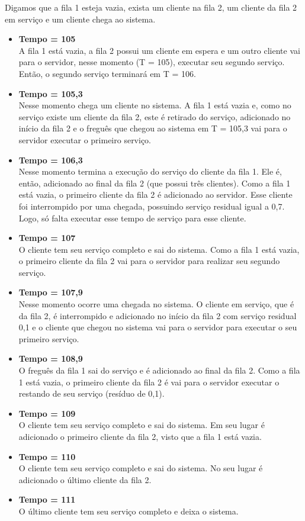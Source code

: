 \documentclass[a4paper,10pt]{article}
\begin{document}
       Digamos que a fila 1 esteja vazia, exista um cliente na fila 2, um cliente da fila 2 em serviço e um cliente chega ao sistema.
      \begin{itemize}
	  \item \textbf{Tempo = 105\\}
	  A fila 1 está vazia, a fila 2 possui um cliente em espera e um outro cliente vai para o servidor, nesse momento (T = 105), executar seu segundo serviço. Então, o segundo serviço terminará em T = 106.
	  \item \textbf{Tempo = 105,3\\}
	  Nesse momento chega um cliente no sistema. A fila 1 está vazia e, como no serviço existe um cliente da fila 2, este é retirado do serviço, adicionado no início da fila 2 e o freguês que chegou ao sistema 
	  em T = 105,3 vai para o servidor executar o primeiro serviço.
	  \item \textbf{Tempo = 106,3\\}
	  Nesse momento termina a execução do serviço do cliente da fila 1. Ele é, então, adicionado ao final da fila 2 (que possui três clientes). Como a fila 1 está vazia, o primeiro cliente da fila 2 é adicionado
	  ao servidor. Esse cliente foi interrompido por uma chegada, possuindo serviço residual igual a 0,7. Logo, só falta executar esse tempo de serviço para esse cliente.
	  \item \textbf{Tempo = 107\\}
	  O cliente tem seu serviço completo e sai do sistema. Como a fila 1 está vazia, o primeiro cliente da fila 2 vai para o servidor para realizar seu segundo serviço.
	  \item \textbf{Tempo = 107,9\\}
	  Nesse momento ocorre uma chegada no sistema. O cliente em serviço, que é da fila 2, é interrompido e adicionado no início da fila 2 com serviço residual 0,1 e o 
	  cliente que chegou no sistema vai para o servidor para executar o seu primeiro serviço.
	  \item \textbf{Tempo = 108,9\\}    
	  O freguês da fila 1 sai do serviço e é adicionado ao final da fila 2. Como a fila 1 está vazia, o primeiro cliente da fila 2 é vai para o servidor executar o restando de seu serviço (resíduo de 0,1).
	  \item \textbf{Tempo = 109\\}
	  O cliente tem seu serviço completo e sai do sistema. Em seu lugar é adicionado o primeiro cliente da fila 2, visto que a fila 1 está vazia.
	  \item \textbf{Tempo = 110\\}
	  O cliente tem seu serviço completo e sai do sistema. No seu lugar é adicionado o último cliente da fila 2.
	  \item \textbf{Tempo = 111\\}
	  O último cliente tem seu serviço completo e deixa o sistema.
      \end{itemize}
\end{document}
